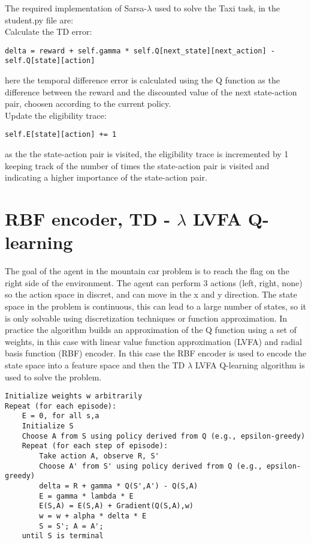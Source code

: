 \documentclass{article}
\begin{document}
The required implementation of Sarsa-$\lambda$ used to solve the Taxi task, in the student.py file are:
\\
Calculate the TD error:
\begin{verbatim}
delta = reward + self.gamma * self.Q[next_state][next_action] - self.Q[state][action]
\end{verbatim}

here the temporal difference error is calculated using the Q function as the difference between
the reward and the discounted value of the next state-action pair,
choosen according to the current policy.
\\
Update the eligibility trace:
\begin{verbatim}
self.E[state][action] += 1
\end{verbatim}

as the the state-action pair is visited, the eligibility trace is incremented by 1
keeping track of the number of times the state-action pair is visited
and indicating a higher importance of the state-action pair.


\section{RBF encoder, TD - $\lambda$ LVFA Q-learning}

The goal of the agent in the mountain car problem is to reach the flag on the right side of the environment.
The agent can perform 3 actions (left, right, none) so the action space in discret,
and can move in the x and y direction.
The state space in the problem is continuous, this can lead to a large number of states,
so it is only solvable using discretization techniques or function approximation.
In practice the algorithm builds an approximation of the Q function using a set of weights,
in this case with linear value function approximation (LVFA) and radial basis function (RBF) encoder.
In this case the RBF encoder is used to encode the state space into a feature space and 
then the TD  $\lambda$ LVFA Q-learning algorithm is used to solve the problem.


\begin{verbatim}
Initialize weights w arbitrarily
Repeat (for each episode):
    E = 0, for all s,a
    Initialize S
    Choose A from S using policy derived from Q (e.g., epsilon-greedy)
    Repeat (for each step of episode):
        Take action A, observe R, S'
        Choose A' from S' using policy derived from Q (e.g., epsilon-greedy)
        delta = R + gamma * Q(S',A') - Q(S,A)
        E = gamma * lambda * E
        E(S,A) = E(S,A) + Gradient(Q(S,A),w)
        w = w + alpha * delta * E
        S = S'; A = A';
    until S is terminal
\end{verbatim}
\end{document}
